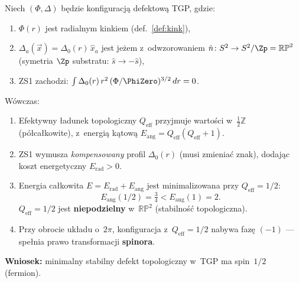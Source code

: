 \begin{theorem}\label{thm:zs1-spin}
Niech $(\Phi, \Delta)$ b\k{e}dzie konfiguracj\k{a} defektow\k{a} TGP,
gdzie:
\begin{enumerate}[nosep]
  \item[(i)] $\Phi(r)$ jest radialnym kinkiem (def.~\ref{def:kink}),
  \item[(ii)] $\Delta_a(\vec{x}) = \Delta_0(r)\,\hat{x}_a$
    jest je\.zem z~odwzorowaniem $\hat{n}\colon S^2 \to S^2/\Zp = \mathbb{RP}^2$
    (symetria $\Zp$ substratu: $\hat{s} \to -\hat{s}$),
  \item[(iii)] ZS1 zachodzi:
    $\int\Delta_0(r)\,r^2\,(\Phi/\PhiZero)^{3/2}\,dr = 0$.
\end{enumerate}
W\'owczas:
\begin{enumerate}[nosep]
  \item[(A)] Efektywny \l{}adunek topologiczny $Q_{\mathrm{eff}}$
    przyjmuje warto\'sci w~$\tfrac{1}{2}\mathbb{Z}$
    (p\'o\l{}ca\l{}kowite), z~energi\k{a} k\k{a}tow\k{a}
    $E_{\mathrm{ang}} = Q_{\mathrm{eff}}(Q_{\mathrm{eff}}+1)$.
  \item[(B)] ZS1 wymusza \emph{kompensowany} profil
    $\Delta_0(r)$ (musi zmienia\'c znak),
    dodaj\k{a}c koszt energetyczny $E_{\mathrm{rad}} > 0$.
  \item[(C)] Energia ca\l{}kowita $E = E_{\mathrm{rad}} + E_{\mathrm{ang}}$
    jest minimalizowana przy $Q_{\mathrm{eff}} = 1/2$:
    \begin{equation}\label{eq:E-ang-half}
      \boxed{E_{\mathrm{ang}}(1/2) = \tfrac{3}{4}
        < E_{\mathrm{ang}}(1) = 2.}
    \end{equation}
    $Q_{\mathrm{eff}} = 1/2$ jest \textbf{niepodzielny}
    w~$\mathbb{RP}^2$ (stabilno\'s\'c topologiczna).
  \item[(D)] Przy obrocie uk\l{}adu o~$2\pi$, konfiguracja
    z~$Q_{\mathrm{eff}} = 1/2$ nabywa faz\k{e} $(-1)$
    --- spe\l{}nia prawo transformacji \textbf{spinora}.
\end{enumerate}
\textbf{Wniosek:} minimalny stabilny defekt topologiczny
w~TGP ma spin~$1/2$ (fermion).
\end{theorem}

